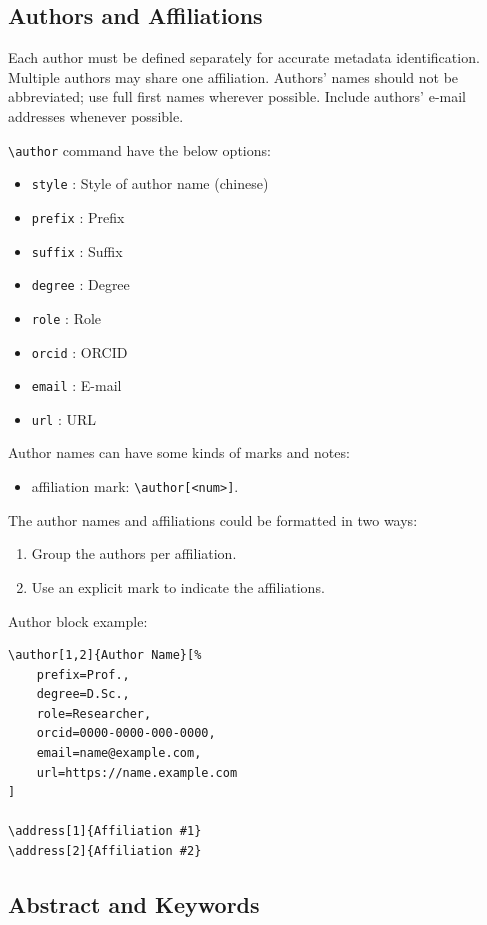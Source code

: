 \documentclass{ceurart}
\begin{document}
\subsection{Authors and Affiliations}

Each author must be defined separately for accurate metadata
identification. Multiple authors may share one affiliation. Authors'
names should not be abbreviated; use full first names wherever
possible. Include authors' e-mail addresses whenever possible.

\verb|\author| command have the below options: 

\begin{itemize}
\item \verb|style| : Style of author name (chinese)
\item \verb|prefix| : Prefix
\item \verb|suffix| : Suffix
\item \verb|degree| : Degree
\item \verb|role| : Role
\item \verb|orcid| : ORCID
\item \verb|email| : E-mail
\item \verb|url| : URL
\end{itemize}

Author names can have some kinds of marks and notes:
\begin{itemize}
\item affiliation mark: \verb|\author[<num>]|.
\end{itemize}

The author names and affiliations could be formatted in two ways:
\begin{enumerate}
\item Group the authors per affiliation.
\item Use an explicit mark to indicate the affiliations.
\end{enumerate}

Author block example:
\begin{lstlisting}
\author[1,2]{Author Name}[%
    prefix=Prof.,
    degree=D.Sc.,
    role=Researcher,
    orcid=0000-0000-000-0000,
    email=name@example.com,
    url=https://name.example.com
]

\address[1]{Affiliation #1}
\address[2]{Affiliation #2}
\end{lstlisting}

\subsection{Abstract and Keywords}
\end{document}
